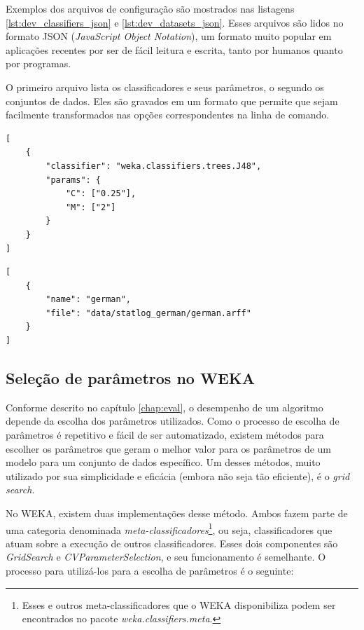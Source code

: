 Exemplos dos arquivos de configuração são mostrados nas listagens \ref{lst:dev_classifiers_json} e \ref{lst:dev_datasets_json}. Esses arquivos são lidos no formato JSON (\emph{JavaScript Object Notation}), um formato muito popular em aplicações recentes por ser de fácil leitura e escrita, tanto por humanos quanto por programas.

O primeiro arquivo lista os classificadores e seus parâmetros, o segundo os conjuntos de dados. Eles são gravados em um formato que permite que sejam facilmente transformados nas opções correspondentes na linha de comando.

\vspace{0.5cm}
\begin{lstlisting}[caption=Exemplo de arquivos de configuração de classificadores, label=lst:dev_classifiers_json]
[
    {
        "classifier": "weka.classifiers.trees.J48",
        "params": {
            "C": ["0.25"],
            "M": ["2"]
        }
    }
]
\end{lstlisting}

\begin{lstlisting}[caption=Exemplo de arquivos de configuração de conjuntos de dados, label=lst:dev_datasets_json]
[
    {
        "name": "german",
        "file": "data/statlog_german/german.arff"
    }
]
\end{lstlisting}
\vspace{0.5cm}

\subsection{Seleção de parâmetros no WEKA}

Conforme descrito no capítulo \ref{chap:eval}, o desempenho de um algoritmo depende da escolha dos parâmetros utilizados. Como o processo de escolha de parâmetros é repetitivo e fácil de ser automatizado, existem métodos para escolher os parâmetros que geram o melhor valor para os parâmetros de um modelo para um conjunto de dados específico. Um desses métodos, muito utilizado por sua simplicidade e eficácia (embora não seja tão eficiente), é o \emph{grid search}.

No WEKA, existem duas implementações desse método. Ambos fazem parte de uma categoria denominada \emph{meta-classificadores}\footnote{Esses e outros meta-classificadores que o WEKA disponibiliza podem ser encontrados no pacote \emph{weka.classifiers.meta}.}, ou seja, classificadores que atuam sobre a execução de outros classificadores. Esses dois componentes são \emph{GridSearch} e \emph{CVParameterSelection}, e seu funcionamento é semelhante. O processo para utilizá-los para a escolha de parâmetros é o seguinte:

